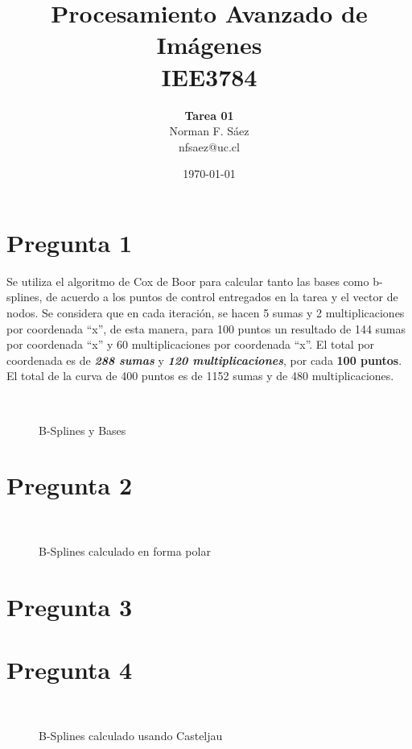 \documentclass[a4paper,10pt]{article}
\title{Procesamiento Avanzado de Imágenes\\IEE3784}
\author{\textbf{Tarea 01}\\Norman F. Sáez\\nfsaez@uc.cl}
\date{\today}
\begin{document}
\maketitle
\section{Pregunta 1}
Se utiliza el algoritmo de Cox de Boor para calcular tanto las bases como
b-splines, de acuerdo a los puntos de control entregados en la tarea y el
vector de nodos.  Se considera que en cada iteración, se hacen 5 sumas y  2
multiplicaciones por coordenada ``x'', de esta manera, para 100 puntos un resultado de
144 sumas por coordenada ``x'' y 60 multiplicaciones por
coordenada ``x''. El total por coordenada es de \textbf{\textit{288
sumas}} y \textbf{\textit{120 multiplicaciones}}, por cada \textbf{100 puntos}.
El total de la curva de 400 puntos es de 1152 sumas y de 480 multiplicaciones.

\begin{figure}[ht!]
  \centering
  ~ 
  ~ 
  \caption{B-Splines y Bases}
  \label{fig:p1}
\end{figure}

\section{Pregunta 2}
\begin{figure}[ht!]
  \centering
  ~ 
  \caption{B-Splines calculado en forma polar}
  \label{fig:p2}
\end{figure}

\section{Pregunta 3}

\section{Pregunta 4}
\begin{figure}[ht!]
  \centering
  ~ 
  \caption{B-Splines calculado usando Casteljau}
  \label{fig:p4}
\end{figure}
\end{document}
